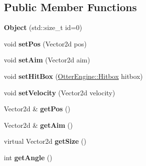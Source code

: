\subsection*{Public Member Functions}
\begin{DoxyCompactItemize}
\item 
{\bfseries Object} (std\+::size\+\_\+t id=0)\hypertarget{class_otter_engine_1_1_object_a84be7987dbc0c0bef967d1137c9515ad}{}\label{class_otter_engine_1_1_object_a84be7987dbc0c0bef967d1137c9515ad}

\item 
void {\bfseries set\+Pos} (Vector2d pos)\hypertarget{class_otter_engine_1_1_object_a5176c80849e5faaadd7097521134614c}{}\label{class_otter_engine_1_1_object_a5176c80849e5faaadd7097521134614c}

\item 
void {\bfseries set\+Aim} (Vector2d aim)\hypertarget{class_otter_engine_1_1_object_a6f49579f57ed0d739746ce1fbebcb6cf}{}\label{class_otter_engine_1_1_object_a6f49579f57ed0d739746ce1fbebcb6cf}

\item 
void {\bfseries set\+Hit\+Box} (\hyperlink{class_otter_engine_1_1_hitbox}{Otter\+Engine\+::\+Hitbox} hitbox)\hypertarget{class_otter_engine_1_1_object_a65db778dfb1fb3c81acd0f3b6bd44f91}{}\label{class_otter_engine_1_1_object_a65db778dfb1fb3c81acd0f3b6bd44f91}

\item 
void {\bfseries set\+Velocity} (Vector2d velocity)\hypertarget{class_otter_engine_1_1_object_a0992ffdb4f01e333a13d5fae68d0cd64}{}\label{class_otter_engine_1_1_object_a0992ffdb4f01e333a13d5fae68d0cd64}

\item 
Vector2d \& {\bfseries get\+Pos} ()\hypertarget{class_otter_engine_1_1_object_ac47bb962cd41c66abb64d84ec9adf98b}{}\label{class_otter_engine_1_1_object_ac47bb962cd41c66abb64d84ec9adf98b}

\item 
Vector2d \& {\bfseries get\+Aim} ()\hypertarget{class_otter_engine_1_1_object_a59c2485a10b413c55a718a5ea1a9e2ea}{}\label{class_otter_engine_1_1_object_a59c2485a10b413c55a718a5ea1a9e2ea}

\item 
virtual Vector2d {\bfseries get\+Size} ()\hypertarget{class_otter_engine_1_1_object_a57a5f05ac0344c81a073ff442195f901}{}\label{class_otter_engine_1_1_object_a57a5f05ac0344c81a073ff442195f901}

\item 
int {\bfseries get\+Angle} ()\hypertarget{class_otter_engine_1_1_object_a46c86ff2b0fe8ce734fc1424e20de1de}{}\label{class_otter_engine_1_1_object_a46c86ff2b0fe8ce734fc1424e20de1de}


\end{DoxyCompactItemize}
